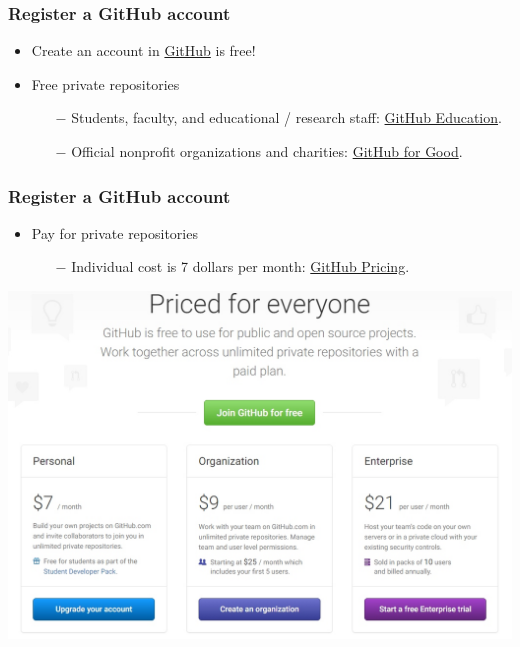 \documentclass[svgnames]{beamer}
\begin{document}
\begin{frame}
\frametitle{Register a GitHub account}
  \begin{itemize}
    \item Create an account in \href{https://github.com/}{ GitHub} is free! \hfill \break
    \item Free private repositories
        \begin{itemize}
        \item[$-$] Students, faculty, and educational / research staff: \href{https://education.github.com/}{ GitHub Education}.
        \item[$-$] Official nonprofit organizations and charities: \href{https://github.com/nonprofit}{ GitHub for Good}.
       \end{itemize}
        
\end{itemize}
\end{frame}

\begin{frame}
\frametitle{Register a GitHub account}
\begin{itemize}
    \item Pay for private repositories
    \begin{itemize}
    \item[$-$] Individual cost is 7 dollars per month: \href{https://github.com/pricing}{ GitHub Pricing}.
    \end{itemize}

\end{itemize}

\begin{center}
\includegraphics[scale=0.35]{img/github_pricing.jpg}
\end{center}  
\end{frame}
\end{document}
